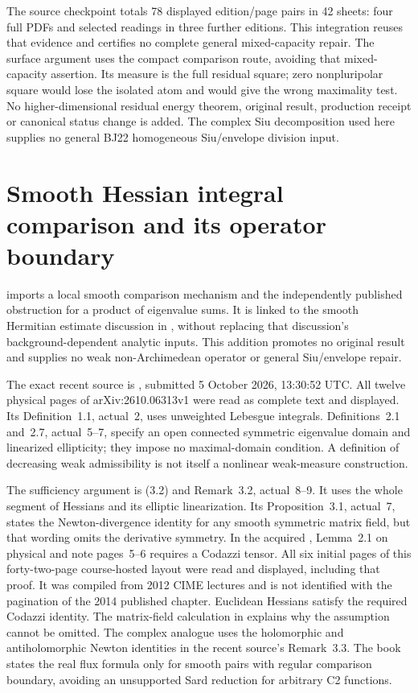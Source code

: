 The source checkpoint totals 78 displayed edition/page pairs
in 42 sheets: four full PDFs and selected readings in three
further editions. This integration reuses that evidence and
certifies no complete general mixed-capacity repair. The
surface argument uses the compact comparison route, avoiding
that mixed-capacity assertion. Its measure is the full residual
square; zero nonpluripolar square would lose the isolated atom
and would give the wrong maximality test. No higher-dimensional
residual energy theorem, original result, production receipt or
canonical status change is added. The complex Siu decomposition
used here supplies no general BJ22 homogeneous Siu/envelope
division input.

\section{Smooth Hessian integral comparison and its operator boundary}
\label{sec:provenance-Hessian-integral-comparison}

 imports a local smooth
comparison mechanism and the independently published obstruction
for a product of eigenvalue sums. It is linked to the smooth
Hermitian estimate discussion in
, without replacing that
discussion's background-dependent analytic inputs. This addition
promotes no original result and supplies no weak non-Archimedean
operator or general Siu/envelope repair.

The exact recent source is
\cite{DinewMygaSroka26IntegralV1}, submitted 5 October 2026,
13:30:52 UTC. All twelve physical pages of arXiv:2610.06313v1
were read as complete text and displayed. Its Definition~1.1,
actual~2, uses unweighted Lebesgue integrals. Definitions~2.1
and~2.7, actual~5--7, specify an open connected symmetric
eigenvalue domain and linearized ellipticity; they impose no
maximal-domain condition. A definition of decreasing weak
admissibility is not itself a nonlinear weak-measure construction.

The sufficiency argument is (3.2) and Remark~3.2, actual~8--9.
It uses the whole segment of Hessians and its elliptic
linearization. Its Proposition~3.1, actual~7, states the
Newton-divergence identity for any smooth symmetric matrix
field, but that wording omits the derivative symmetry. In the
acquired \cite{GuanCIMECourseNotes}, Lemma~2.1 on physical
and note pages~5--6 requires a Codazzi tensor. All six initial
pages of this forty-two-page course-hosted layout were read
and displayed, including that proof. It was compiled from
2012 CIME lectures and is not identified with the pagination
of the 2014 published chapter. Euclidean Hessians satisfy the
required Codazzi identity. The matrix-field calculation in
 explains why the assumption
cannot be omitted. The complex analogue uses the holomorphic
and antiholomorphic Newton identities in the recent source's
Remark~3.3. The book states the real flux formula only for
smooth pairs with regular comparison boundary, avoiding an
unsupported Sard reduction for arbitrary C2 functions.

